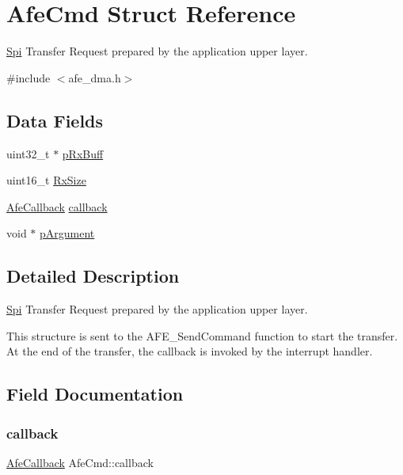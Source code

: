 \hypertarget{structAfeCmd}{}\section{Afe\+Cmd Struct Reference}
\label{structAfeCmd}


\mbox{\hyperlink{structSpi}{Spi}} Transfer Request prepared by the application upper layer.  




{\ttfamily \#include $<$afe\+\_\+dma.\+h$>$}

\subsection*{Data Fields}
\begin{DoxyCompactItemize}
\item 
uint32\+\_\+t $\ast$ \mbox{\hyperlink{structAfeCmd_ab8d8985b071433f46a697212abdbde66}{p\+Rx\+Buff}}
\item 
uint16\+\_\+t \mbox{\hyperlink{structAfeCmd_ac9f33a4b9f53311a46955112a911e89b}{Rx\+Size}}
\item 
\mbox{\hyperlink{afe__dma_8h_a8ff91157e395d9c195d32871d42f01e8}{Afe\+Callback}} \mbox{\hyperlink{structAfeCmd_ae15934ecb97187c8bce2bde7d6a1f3d5}{callback}}
\item 
void $\ast$ \mbox{\hyperlink{structAfeCmd_ad5547df2ec1a00f7e25465a0093349f8}{p\+Argument}}
\end{DoxyCompactItemize}


\subsection{Detailed Description}
\mbox{\hyperlink{structSpi}{Spi}} Transfer Request prepared by the application upper layer. 

This structure is sent to the A\+F\+E\+\_\+\+Send\+Command function to start the transfer. At the end of the transfer, the callback is invoked by the interrupt handler. 

\subsection{Field Documentation}
\mbox{\label{structAfeCmd_ae15934ecb97187c8bce2bde7d6a1f3d5}} 
\subsubsection{\texorpdfstring{callback}{callback}}
{\footnotesize\ttfamily \mbox{\hyperlink{afe__dma_8h_a8ff91157e395d9c195d32871d42f01e8}{Afe\+Callback}} Afe\+Cmd\+::callback}

